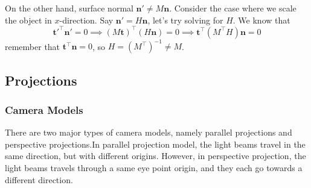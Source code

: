 \documentclass[11pt]{article}
\newcommand{\bn}{\mathbf{n}}
\newcommand{\bt}{\mathbf{t}}
\begin{document}
On the other hand, surface normal $\bn' \neq M\bn$. Consider the case where we scale the object in $x$-direction. Say $\bn' = H\bn$, let's try solving for $H$. We know that 
\begin{equation}
	\bt'^\top \bn' = 0 \implies (M\bt)^\top (H\bn) = 0 \implies \bt^\top (M^\top H) \bn = 0
\end{equation}
remember that $\bt^\top \bn = 0$, so $H = (M^\top) ^{-1} \neq M$. 

\subsection{Projections}
\subsubsection{Camera Models}
There are two major types of camera models, namely parallel projections and perspective projections.In parallel projection model, the light beams travel in the same direction, but with different origins. However, in perspective projection, the light beams travels through a same eye point origin, and they each go towards a different direction. 
\end{document}

